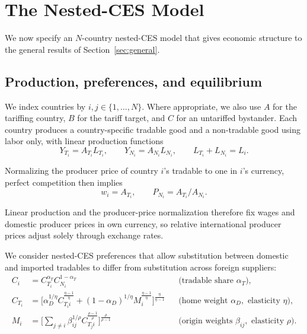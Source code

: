\documentclass[11pt]{article}
\begin{document}
\section{The Nested-CES Model}
\label{sec:model}

We now specify an $N$-country nested-CES model that gives economic structure to the general results of Section~\ref{sec:general}.

\subsection{Production, preferences, and equilibrium}
\label{sec:setup}

We index countries by $i,j \in \{1,\dots,N\}$. Where appropriate, we also use $A$ for the tariffing country, $B$ for the tariff target, and $C$ for an untariffed bystander. Each country produces a country-specific tradable good and a non-tradable good using labor only, with linear production functions
\begin{equation*}
Y_{T_i}=A_{T_i}L_{T_i}, \qquad Y_{N_i}=A_{N_i}L_{N_i}, \qquad L_{T_i}+L_{N_i}=L_i.
\end{equation*}

Normalizing the producer price of country $i$'s tradable to one in $i$'s currency, perfect competition then implies
\begin{equation*}
w_i=A_{T_i}, \qquad P_{N_i}=A_{T_i}/A_{N_i}.
\end{equation*}

Linear production and the producer-price normalization therefore fix wages and domestic producer prices in own currency, so relative international producer prices adjust solely through exchange rates.

We consider nested-CES preferences that allow substitution between domestic and imported tradables to differ from substitution across foreign suppliers:
\begin{align*}
C_i &= C_{T_i}^{\alpha_T}C_{N_i}^{1-\alpha_T}
&& \text{(tradable share } \alpha_T),\\[2pt]
C_{T_i} &= \Big[\alpha_D^{1/\eta}C_{T_i i}^{\frac{\eta-1}{\eta}}
+(1-\alpha_D)^{1/\eta}M_i^{\frac{\eta-1}{\eta}}\Big]^{\frac{\eta}{\eta-1}}
&& \text{(home weight } \alpha_D,\text{ elasticity } \eta),\\[2pt]
M_i &= \Big[\textstyle\sum_{j\neq i}\beta_{ij}^{1/\rho}C_{T_j i}^{\frac{\rho-1}{\rho}}\Big]^{\frac{\rho}{\rho-1}}
&& \text{(origin weights } \beta_{ij},\text{ elasticity } \rho).
\end{align*}
\end{document}

